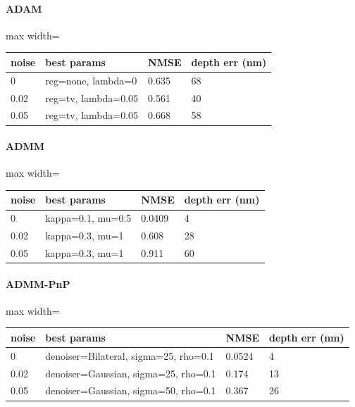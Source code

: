 \paragraph{ADAM}
\begin{center}\begin{adjustbox}{max width=\linewidth}
\begin{tabular}{llll}
\toprule
noise & best params & NMSE & depth err (nm) \\
\midrule
0 & reg=none, lambda=0 & 0.635 & 68 \\
0.02 & reg=tv, lambda=0.05 & 0.561 & 40 \\
0.05 & reg=tv, lambda=0.05 & 0.668 & 58 \\
\bottomrule
\end{tabular}\end{adjustbox}\end{center}
\paragraph{ADMM}
\begin{center}\begin{adjustbox}{max width=\linewidth}
\begin{tabular}{llll}
\toprule
noise & best params & NMSE & depth err (nm) \\
\midrule
0 & kappa=0.1, mu=0.5 & 0.0409 & 4 \\
0.02 & kappa=0.3, mu=1 & 0.608 & 28 \\
0.05 & kappa=0.3, mu=1 & 0.911 & 60 \\
\bottomrule
\end{tabular}\end{adjustbox}\end{center}
\paragraph{ADMM-PnP}
\begin{center}\begin{adjustbox}{max width=\linewidth}
\begin{tabular}{llll}
\toprule
noise & best params & NMSE & depth err (nm) \\
\midrule
0 & denoiser=Bilateral, sigma=25, rho=0.1 & 0.0524 & 4 \\
0.02 & denoiser=Gaussian, sigma=25, rho=0.1 & 0.174 & 13 \\
0.05 & denoiser=Gaussian, sigma=50, rho=0.1 & 0.367 & 26 \\
\bottomrule
\end{tabular}\end{adjustbox}\end{center}
